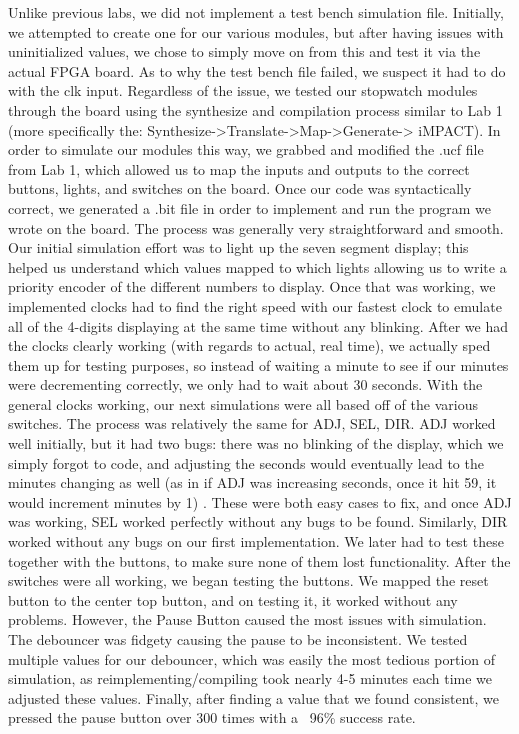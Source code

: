 \documentclass{article}
\begin{document}
Unlike previous labs, we did not implement a test bench simulation file.  Initially, we attempted to create one for our various modules, but after having issues with uninitialized values, we chose to simply move on from this and test it via the actual FPGA board.  As to why the test bench file failed, we suspect it had to do with the clk input.  Regardless of the issue, we tested our stopwatch modules through the board using the synthesize and compilation process similar to Lab 1 (more specifically the: Synthesize->Translate->Map->Generate-> iMPACT).  
	In order to simulate our modules this way, we grabbed and modified the .ucf file from Lab 1, which allowed us to map the inputs and outputs to the correct buttons, lights, and switches on the board.  Once our code was syntactically correct, we generated a .bit file in order to implement and run the program we wrote on the board. 
	The process was generally very straightforward and smooth.  Our initial simulation effort was to light up the seven segment display; this helped us understand which values mapped to which lights allowing us to write a priority encoder of the different numbers to display.  Once that was working, we implemented clocks had to find the right speed with our fastest clock to emulate all of the 4-digits displaying at the same time without any blinking. After we had the clocks clearly working (with regards to actual, real time), we actually sped them up for testing purposes, so instead of waiting a minute to see if our minutes were decrementing correctly, we only had to wait about 30 seconds. 
	With the general clocks working, our next simulations were all based off of the various switches.  The process was relatively the same for ADJ, SEL, DIR.  ADJ worked well initially, but it had two bugs: there was no blinking of the display, which we simply forgot to code, and adjusting the seconds would eventually lead to the minutes changing as well (as in if ADJ was increasing seconds, once it hit 59, it would increment minutes by 1) .  These were both easy cases to fix, and once ADJ was working, SEL worked perfectly without any bugs to be found.  Similarly, DIR worked without any bugs on our first implementation.  We later had to test these together with the buttons, to make sure none of them lost functionality.
	After the switches were all working, we began testing the buttons.  We mapped the reset button to the center top button, and on testing it, it worked without any problems.  However, the Pause Button caused the most issues with simulation.  The debouncer was fidgety causing the pause to be inconsistent.  We tested multiple values for our debouncer, which was easily the most tedious portion of simulation, as reimplementing/compiling took nearly 4-5 minutes each time we adjusted these values.  Finally, after finding a value that we found consistent, we pressed the pause button over 300 times with a ~96\% success rate.  
\end{document}
